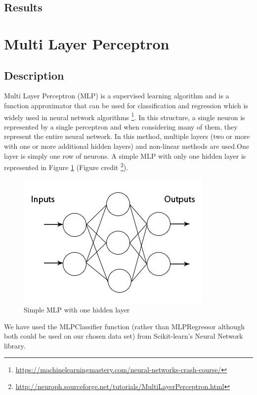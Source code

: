 \documentclass[twocolumn]{scrartcl}
\begin{document}
\subsection{Results}

\section{Multi Layer Perceptron}
\subsection{Description}
Multi Layer Perceptron (MLP) is a supervised learning algorithm and is a function approximator that can be used for classification and regression which is widely used in neural network algorithms \footnote{\url{https://machinelearningmastery.com/neural-networks-crash-course/}}.
In this structure, a single neuron is represented by a single perceptron and when considering many of them, they represent the entire neural network. In this method, multiple layers (two or more with one or more additional hidden layers) and non-linear methods are used.One layer is simply one row of neurons. A simple MLP with only one hidden layer is represented in Figure \ref{fig:mlp} (Figure credit \footnote{\url{http://neuroph.sourceforge.net/tutorials/MultiLayerPerceptron.html}}).

\begin{figure}[h]
	\centering
	\includegraphics[width=\linewidth]{images/mlp.jpeg}
	\caption{Simple MLP with one hidden layer}
	\label{fig:mlp}
\end{figure}

We have used the MLPClassifier function (rather than MLPRegressor although both could be used on our  chosen data set) from Scikit-learn's Neural Network library.
\end{document}
